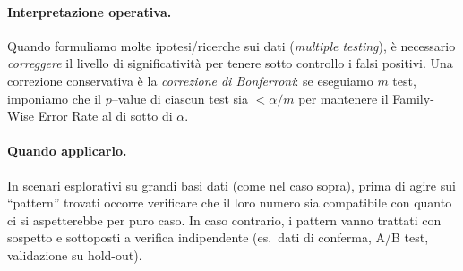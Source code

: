 \paragraph{Interpretazione operativa.} Quando formuliamo molte ipotesi/ricerche sui dati (\emph{multiple testing}), è necessario \emph{correggere} il livello di significatività per tenere sotto controllo i falsi positivi. Una correzione conservativa è la \emph{correzione di Bonferroni}: se eseguiamo $m$ test, imponiamo che il $p$--value di ciascun test sia $< \alpha/m$ per mantenere il Family-Wise Error Rate al di sotto di $\alpha$.
%
\paragraph{Quando applicarlo.} In scenari esplorativi su grandi basi dati (come nel caso sopra), prima di agire sui ``pattern'' trovati occorre verificare che il loro numero sia compatibile con quanto ci si aspetterebbe per puro caso. In caso contrario, i pattern vanno trattati con sospetto e sottoposti a verifica indipendente (es.\ dati di conferma, A/B test, validazione su hold-out).

